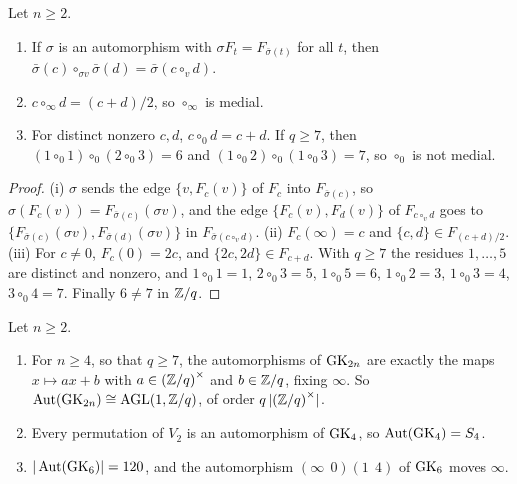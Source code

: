 \begin{lemma}\label{lem:localsq}
Let $n\ge2$.
\begin{enumerate}
\item If $\sigma$ is an automorphism with $\sigma F_t=F_{\bar\sigma(t)}$ for all $t$, then $\bar\sigma(c)\circ_{\sigma v}\bar\sigma(d)=\bar\sigma(c\circ_{v}d)$.
\item $c\circ_\infty d=(c+d)/2$, so $\circ_\infty$ is medial.
\item For distinct nonzero $c,d$, $c\circ_{0}d=c+d$. If $q\ge7$, then $(1\circ_{0}1)\circ_0(2\circ_{0}3)=6$ and $(1\circ_{0}2)\circ_0(1\circ_{0}3)=7$, so $\circ_0$ is not medial.
\end{enumerate}
\end{lemma}

\begin{proof}
(i) $\sigma$ sends the edge $\{v,F_c(v)\}$ of $F_c$ into $F_{\bar\sigma(c)}$, so $\sigma(F_c(v))=F_{\bar\sigma(c)}(\sigma v)$, and the edge $\{F_c(v),F_d(v)\}$ of $F_{c\circ_{v}d}$ goes to $\{F_{\bar\sigma(c)}(\sigma v),F_{\bar\sigma(d)}(\sigma v)\}$ in $F_{\bar\sigma(c\circ_{v}d)}$. (ii) $F_c(\infty)=c$ and $\{c,d\}\in F_{(c+d)/2}$. (iii) For $c\ne0$, $F_c(0)=2c$, and $\{2c,2d\}\in F_{c+d}$. With $q\ge7$ the residues $1,\dots,5$ are distinct and nonzero, and $1\circ_{0}1=1$, $2\circ_{0}3=5$, $1\circ_{0}5=6$, $1\circ_{0}2=3$, $1\circ_{0}3=4$, $3\circ_{0}4=7$. Finally $6\ne7$ in $\mathbb{Z}/q$.
\end{proof}

\begin{theorem}[Cameron]\label{thm:aut}
Let $n\ge2$.
\begin{enumerate}
\item For $n\ge4$, so that $q\ge7$, the automorphisms of $\mathrm{GK}_{2n}$ are exactly the maps $x\mapsto ax+b$ with $a\in{(\mathbb{Z}/q)}^\times$ and $b\in\mathbb{Z}/q$, fixing $\infty$. So $\operatorname{Aut}(\mathrm{GK}_{2n})\cong\operatorname{AGL}(1,\mathbb{Z}/q)$, of order $q\,|{(\mathbb{Z}/q)}^\times|$.
\item Every permutation of $V_2$ is an automorphism of $\mathrm{GK}_4$, so $\operatorname{Aut}(\mathrm{GK}_4)=S_4$.
\item $|\operatorname{Aut}(\mathrm{GK}_6)|=120$, and the automorphism $(\infty\;\,0)(1\;\,4)$ of $\mathrm{GK}_6$ moves $\infty$.
\end{enumerate}
\end{theorem}

